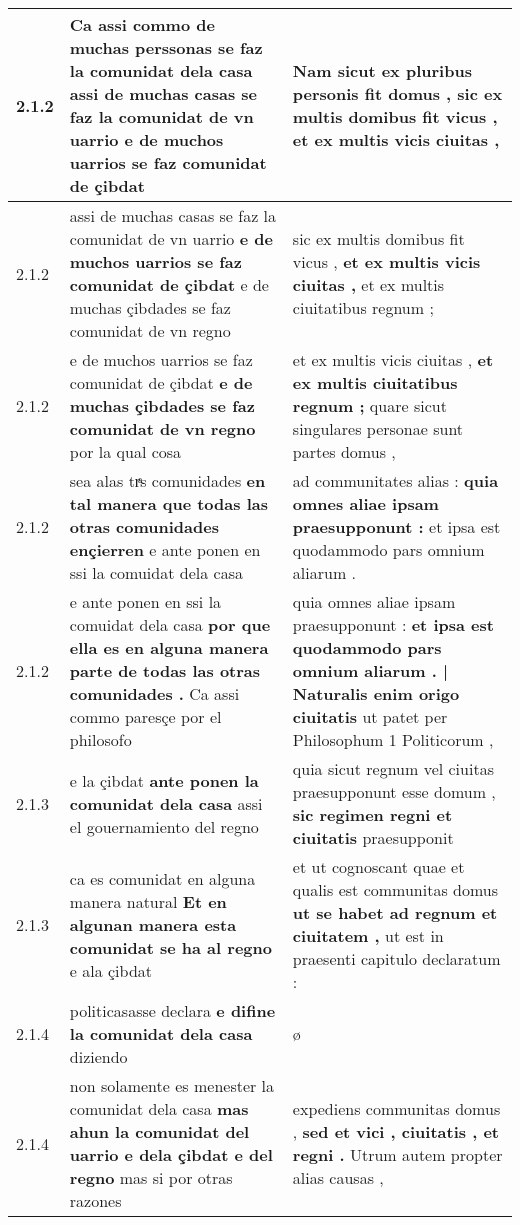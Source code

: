 \begin{tabular}{|p{1cm}|p{6.5cm}|p{6.5cm}|}
2.1.2 & Ca assi commo de muchas perssonas se faz la comunidat dela casa \textbf{ assi de muchas casas se faz la comunidat de vn uarrio } e de muchos uarrios se faz comunidat de çibdat & Nam sicut ex pluribus personis fit domus , \textbf{ sic ex multis domibus fit vicus , } et ex multis vicis ciuitas , \\\hline
2.1.2 & assi de muchas casas se faz la comunidat de vn uarrio \textbf{ e de muchos uarrios se faz comunidat de çibdat } e de muchas çibdades se faz comunidat de vn regno & sic ex multis domibus fit vicus , \textbf{ et ex multis vicis ciuitas , } et ex multis ciuitatibus regnum ; \\\hline
2.1.2 & e de muchos uarrios se faz comunidat de çibdat \textbf{ e de muchas çibdades se faz comunidat de vn regno } por la qual cosa & et ex multis vicis ciuitas , \textbf{ et ex multis ciuitatibus regnum ; } quare sicut singulares personae sunt partes domus , \\\hline
2.1.2 & sea alas trͣs comunidades \textbf{ en tal manera que todas las otras comunidades ençierren } e ante ponen en ssi la comuidat dela casa & ad communitates alias : \textbf{ quia omnes aliae ipsam praesupponunt : } et ipsa est quodammodo pars omnium aliarum . \\\hline
2.1.2 & e ante ponen en ssi la comuidat dela casa \textbf{ por que ella es en alguna manera parte de todas las otras comunidades . } Ca assi commo paresçe por el philosofo & quia omnes aliae ipsam praesupponunt : \textbf{ et ipsa est quodammodo pars omnium aliarum . | Naturalis enim origo ciuitatis } ut patet per Philosophum 1 Politicorum , \\\hline
2.1.3 & e la çibdat \textbf{ ante ponen la comunidat dela casa } assi el gouernamiento del regno & quia sicut regnum vel ciuitas praesupponunt esse domum , \textbf{ sic regimen regni et ciuitatis } praesupponit \\\hline
2.1.3 & ca es comunidat en alguna manera natural \textbf{ Et en algunan manera esta comunidat se ha al regno } e ala çibdat & et ut cognoscant quae et qualis est communitas domus \textbf{ ut se habet ad regnum et ciuitatem , } ut est in praesenti capitulo declaratum : \\\hline
2.1.4 & politicasasse declara \textbf{ e difine la comunidat dela casa } diziendo & ø \\\hline
2.1.4 & non solamente es menester la comunidat dela casa \textbf{ mas ahun la comunidat del uarrio e dela çibdat e del regno } mas si por otras razones & expediens communitas domus , \textbf{ sed et vici , ciuitatis , et regni . } Utrum autem propter alias causas , \\\hline

\end{tabular}
